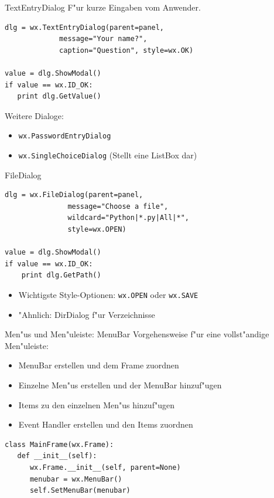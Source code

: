 \begin{frame}[fragile]{TextEntryDialog}
F"ur kurze Eingaben vom Anwender.
\begin{lstlisting}[style=Python]
dlg = wx.TextEntryDialog(parent=panel,
             message="Your name?",
             caption="Question", style=wx.OK)

value = dlg.ShowModal()
if value == wx.ID_OK:
   print dlg.GetValue()
\end{lstlisting}
Weitere Dialoge:
\begin{itemize}
\item \lstinline{wx.PasswordEntryDialog}
\item \lstinline{wx.SingleChoiceDialog} (Stellt eine ListBox dar)
\end{itemize}
\end{frame}


\begin{frame}[fragile]{FileDialog}
\begin{lstlisting}
dlg = wx.FileDialog(parent=panel,
               message="Choose a file",
               wildcard="Python|*.py|All|*",
               style=wx.OPEN)

value = dlg.ShowModal()
if value == wx.ID_OK:
    print dlg.GetPath()
\end{lstlisting}
\begin{itemize}
\item Wichtigste Style-Optionen: \lstinline{wx.OPEN} oder \lstinline{wx.SAVE}
\item "Ahnlich: \alert{DirDialog} f"ur Verzeichnisse
\end{itemize}
\end{frame}


\begin{frame}[fragile]{Men"us und Men"uleiste: MenuBar}
Vorgehensweise f"ur eine vollst"andige Men"uleiste:
\begin{itemize}
\item \alert{MenuBar} erstellen und dem Frame zuordnen
\item Einzelne \alert{Men"us} erstellen und der MenuBar hinzuf"ugen
\item \alert{Items} zu den einzelnen Men"us hinzuf"ugen
\item \alert{Event Handler} erstellen und den Items zuordnen
\end{itemize}
\begin{lstlisting}[style=Python]
class MainFrame(wx.Frame):
   def __init__(self):
      wx.Frame.__init__(self, parent=None)
      menubar = wx.MenuBar()
      self.SetMenuBar(menubar)
\end{lstlisting}
\end{frame}

